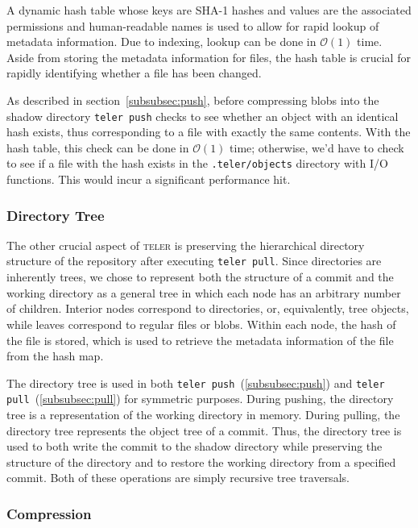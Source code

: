 \documentclass[11pt, letterpaper]{article}
\begin{document}
\begin{multicols}{2}
  A dynamic hash table whose keys are SHA-1 hashes and values are
  the associated permissions and human-readable names is used to allow
  for rapid lookup of metadata information. Due to indexing, lookup
  can be done in $\mathcal{O}(1)$ time. Aside from storing the
  metadata information for files, the hash table is crucial for rapidly
  identifying whether a file has been changed.

  As described in section~\ref{subsubsec:push}, before compressing
  blobs into the shadow directory \texttt{teler push} checks to see
  whether an object with an identical hash exists, thus corresponding
  to a file with exactly the same contents. With the hash table, this
  check can be done in $\mathcal{O}(1)$ time; otherwise, we'd have to
  check to see if a file with the hash exists in the
  \texttt{.teler/objects} directory with I/O functions. This would
  incur a significant performance hit.

  \subsubsection{Directory Tree}
  \label{subsubsec:tree}

  The other crucial aspect of \textsc{teler} is preserving
  the hierarchical directory structure of the repository after
  executing \texttt{teler pull}. Since directories are inherently
  trees, we chose to represent both the structure of a commit and the
  working directory as a general tree in which each node has an
  arbitrary number of children. Interior nodes correspond to
  directories, or, equivalently, tree objects, while leaves correspond
  to regular files or blobs. Within each node, the hash of the file is
  stored, which is used to retrieve the metadata information of the
  file from the hash map.

  The directory tree is used in both \texttt{teler
    push}~(\ref{subsubsec:push}) and \texttt{teler
    pull}~(\ref{subsubsec:pull}) for symmetric purposes. During
  pushing, the directory tree is a representation of the working
  directory in memory. During pulling, the directory tree
  represents the object tree of a commit. Thus, the directory tree is
  used to both write the commit to the shadow directory while
  preserving the structure of the directory and to restore the working
  directory from a specified commit. Both of these operations are
  simply recursive tree traversals.

  \subsubsection{Compression}
  \label{subsec:compression}


\end{multicols}
\end{document}
